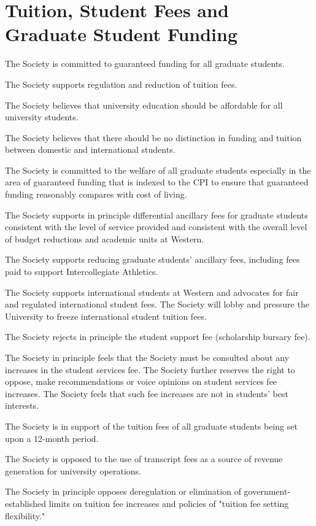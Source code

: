 \section{Tuition, Student Fees and Graduate Student Funding}
\begin{longenum}[ label*=\thesection.\arabic*., align=left]
\item  The Society is committed to guaranteed funding for all graduate students.
\item The Society supports regulation and reduction of tuition fees.
\item The Society believes that university education should be affordable for all university students.
\item The Society believes that there should be no distinction in funding and tuition between domestic and international students.
\item The Society is committed to the welfare of all graduate students especially in the area of guaranteed funding that is indexed to the CPI to ensure that guaranteed funding reasonably compares with cost of living.
\item The Society supports in principle differential ancillary fees for graduate students consistent with the level of service provided and consistent with the overall level of budget reductions and academic units at Western.
\item The Society supports reducing graduate students’ ancillary fees, including fees paid to support Intercollegiate Athletics.
\item The Society supports international students at Western and advocates for fair and regulated international student fees. The Society will lobby and pressure the University to freeze international student tuition fees.
\item The Society rejects in principle the student support fee (scholarship bursary fee).
\item The Society in principle feels that the Society must be consulted about any increases in the student services fee. The Society further reserves the right to oppose, make recommendations or voice opinions on student services fee increases. The Society feels that such fee increases are not in students’ best interests.
\item The Society is in support of the tuition fees of all graduate students being set upon a 12-month period.
\item The Society is opposed to the use of transcript fees as a source of revenue generation for university operations.
\item The Society in principle opposes deregulation or elimination of government-established limits on tuition fee increases and policies of "tuition fee setting flexibility."
\end{longenum}	

